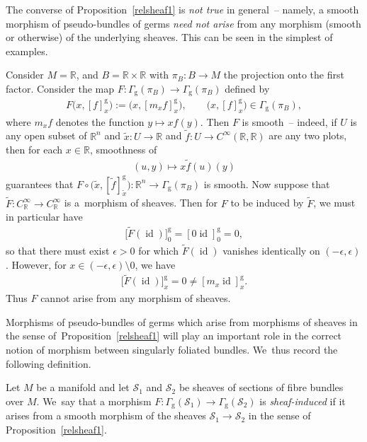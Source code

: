 \documentclass[10pt,a4paper]{amsart}
\numberwithin{equation}{section}
\def\g{\operatorname{g}}
\def\id{\operatorname{id}}
\def\SS{{\mathscr{S}}}
\def\RB{{\mathbb{R}}}
\begin{document}
The converse of Proposition~\ref{relsheaf1} is \textit{not true} in general~-- namely, a smooth morphism of pseudo-bundles of germs \textit{need not arise} from any morphism (smooth or otherwise) of the underlying sheaves. This can be seen in the simplest of examples.

\begin{Example}%
Consider $M = \RB$, and $B=\RB\times\RB$ with $\pi_{B}\colon B\rightarrow M$ the projection onto the first factor. Consider the map $F\colon \Gamma_{\g}(\pi_{B})\rightarrow\Gamma_{\g}(\pi_{B})$ defined by
\begin{gather*}
F\big(x,[f]^{\g}_{x}\big):=\big(x,[m_{x}f]^{\g}_{x}\big),\qquad \big(x,[f]^{\g}_{x}\big)\in\Gamma_{\g}(\pi_{B}),
\end{gather*}
where $m_{x}f$ denotes the function $y\mapsto xf(y)$. Then $F$ is smooth~-- indeed, if $U$ is any open subset of $\RB^{n}$ and $\tilde{x}\colon U\rightarrow\RB$ and $\tilde{f}\colon U\rightarrow C^{\infty}(\RB,\RB)$ are any two plots, then for each $x\in\RB$, smoothness of
\begin{gather*}
(u,y)\mapsto x\tilde{f}(u)(y)
\end{gather*}
guarantees that $F\circ\big(\tilde{x},[\tilde{f}]^{\g}_{\tilde{x}}\big)\colon \RB^{n}\rightarrow\Gamma_{\g}(\pi_{B})$ is smooth. Now suppose that $\tilde{F}\colon C^{\infty}_{\RB}\rightarrow C^{\infty}_{\RB}$ is a~morphism of sheaves. Then for $F$ to be induced by $\tilde{F}$, we must in particular have
\begin{gather*}
\big[\tilde{F}(\id)\big]^{\g}_{0} = [0\id]^{\g}_{0} = 0,
\end{gather*}
so that there must exist $\epsilon>0$ for which $\tilde{F}(\id)$ vanishes identically on $(-\epsilon,\epsilon)$. However, for $x\in(-\epsilon,\epsilon)\setminus 0$, we have
\begin{gather*}
\big[\tilde{F}(\id)\big]^{\g}_{x} = 0\neq[m_{x}\id]^{\g}_{x}.
\end{gather*}
Thus $F$ cannot arise from any morphism of sheaves.
\end{Example}

Morphisms of pseudo-bundles of germs which arise from morphisms of sheaves in the sense of~Pro\-position~\ref{relsheaf1} will play an important role in the correct notion of morphism between singularly foliated bundles. We~thus record the following definition.

\begin{Definition}
Let $M$ be a manifold and let $\SS_{1}$ and $\SS_{2}$ be sheaves of sections of fibre bundles over $M$. We~say that a morphism $F\colon \Gamma_{\g}(\SS_{1})\rightarrow\Gamma_{\g}(\SS_{2})$ is \textit{sheaf-induced} if it arises from a smooth morphism of the sheaves $\SS_{1}\rightarrow\SS_{2}$ in the sense of Proposition~\ref{relsheaf1}.
\end{Definition}
\end{document}
